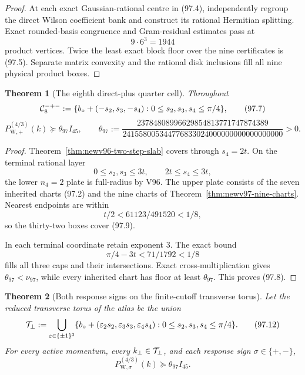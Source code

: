 \documentclass[11pt,oneside]{article}
\newtheorem{theorem}{Theorem}[section]
\theoremstyle{definition}
\theoremstyle{remark}
\begin{document}
\begin{proof}
At each exact Gaussian-rational centre in (97.4), independently
regroup the direct Wilson coefficient bank and construct its
rational Hermitian splitting.  Exact rounded-basis congruence and
Gram-residual estimates pass at
\[
 9\cdot6^3=1944                                     \tag{97.6}
\]
product vertices.  Twice the least exact block floor over the nine
certificates is (97.5).  Separate matrix convexity and the rational
disk inclusions fill all nine physical product boxes.
\end{proof}

\begin{theorem}[The eighth direct-plus quarter cell]
\label{thm:newv97-eighth-cell}
Throughout
\[
 {\cal C}^{-+-}_8:=
 \{b_\circ+(-s_2,s_3,-s_4):
 0\leq s_2,s_3,s_4\leq\pi/4\},                      \tag{97.7}
\]
\[
 P_{\mathrm W,+}^{(4/3)}(k)
 \succeq\theta_{97}I_{45},\qquad
 \theta_{97}:=
 \frac{23784808996629854813771747874389}
 {241558005344776833024000000000000000000}>0.         \tag{97.8}
\]
\end{theorem}

\begin{proof}
Theorem~\ref{thm:newv96-two-step-slab} covers through \(s_4=2t\).
On the terminal rational layer
\[
 0\leq s_2,s_3\leq3t,\qquad2t\leq s_4\leq3t,        \tag{97.9}
\]
the lower \(n_4=2\) plate is full-radius by V96.  The upper plate
consists of the seven inherited charts (97.2) and the nine charts
of Theorem~\ref{thm:newv97-nine-charts}.  Nearest endpoints are
within
\[
 t/2<61123/491520<1/8,                              \tag{97.10}
\]
so the thirty-two boxes cover (97.9).

In each terminal coordinate retain exponent \(3\).  The exact
bound
\[
 \pi/4-3t<71/1792<1/8                               \tag{97.11}
\]
fills all three caps and their intersections.  Exact
cross-multiplication gives \(\theta_{97}<\nu_{97}\), while every
inherited chart has floor at least \(\theta_{97}\).  This proves
(97.8).
\end{proof}

\begin{theorem}[Both response signs on the finite-cutoff transverse torus]
\label{thm:newv97-full-torus}
Let the reduced transverse torus of the atlas be the union
\[
 {\cal T}_{\perp}:=
 \bigcup_{\varepsilon\in\{\pm1\}^3}
 \{b_\circ+(\varepsilon_2s_2,\varepsilon_3s_3,
             \varepsilon_4s_4):
   0\leq s_2,s_3,s_4\leq\pi/4\}.                    \tag{97.12}
\]
For every active momentum, every \(k_\perp\in{\cal T}_{\perp}\),
and each response sign \(\sigma\in\{+,-\}\),
\[
 P_{\mathrm W,\sigma}^{(4/3)}(k)
 \succeq\theta_{97}I_{45}.                           \tag{97.13}
\]
\end{theorem}
\end{document}
